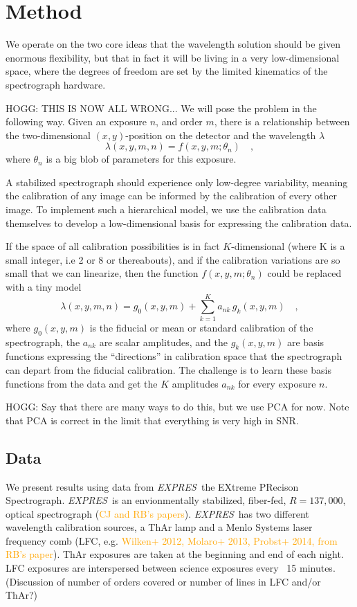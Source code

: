 \documentclass[12pt, letterpaper]{article}
\newcommand{\lz}[1]{\textcolor{orange}{#1}}
\newcommand{\project}[1]{\textsl{#1}}
\newcommand{\acronym}[1]{{\small{#1}}}
\newcommand{\expres}{\project{\acronym{EXPRES}}}
\begin{document}
\section{Method} \label{sec:method}
We operate on the two core ideas that the wavelength solution should be given enormous flexibility, but that in fact it will be living in a very low-dimensional space, where the degrees of freedom are set by the limited kinematics of the spectrograph hardware.

HOGG: THIS IS NOW ALL WRONG... We will pose the problem in the following way.  Given an exposure $n$, and order $m$, there is a relationship between
the two-dimensional $(x,y)$-position on the detector and the
wavelength $\lambda$
\begin{equation}
\lambda(x,y,m,n) = f(x,y,m;\theta_{n})
\quad ,
\end{equation}
where $\theta_{n}$ is a big blob of parameters for this exposure.

A stabilized spectrograph should experience only low-degree variability, meaning the calibration of any image can be informed by the calibration of every other image.  To implement such a hierarchical model, we use the calibration data themselves to develop a low-dimensional basis for expressing the calibration data.

If the space of all calibration possibilities is in fact $K$-dimensional (where K is a small integer, i.e 2 or 8 or thereabouts), and if the calibration variations are so
small that we can linearize, then the function $f(x,y,m;\theta_{n})$ could
be replaced with a tiny model
\begin{equation}
\lambda(x,y,m,n) = g_0(x,y,m) + \sum_{k=1}^K a_{nk}\,g_k(x,y,m)
\quad ,
\end{equation}
where
$g_0(x,y,m)$ is the fiducial or mean or standard calibration of the
spectrograph,
the $a_{nk}$ are scalar amplitudes,
and the $g_k(x,y,m)$ are basis functions expressing the ``directions'' in calibration space that the spectrograph can depart from the
fiducial calibration.
The challenge is to learn these basis functions from the data and get
the $K$ amplitudes $a_{nk}$ for every exposure $n$.

HOGG: Say that there are many ways to do this, but we use PCA for now.
Note that PCA is correct in the limit that everything is very high in SNR.

\subsection{Data} \label{sec:data}
We present results using data from \expres\, the EXtreme PRecison Spectrograph.  \expres\ is an envionmentally stabilized, fiber-fed, $R=137,000$, optical spectrograph (\lz{CJ and RB's papers}).  \expres\ has two different wavelength calibration sources, a ThAr lamp and a Menlo Systems laser frequency comb (LFC, e.g. \lz{Wilken+ 2012, Molaro+ 2013, Probst+ 2014, from RB's paper}).  ThAr exposures are taken at the beginning and end of each night.  LFC exposures are interspersed between science exposures every ~15 minutes.  
(Discussion of number of orders covered or number of lines in LFC and/or ThAr?)
\end{document}
